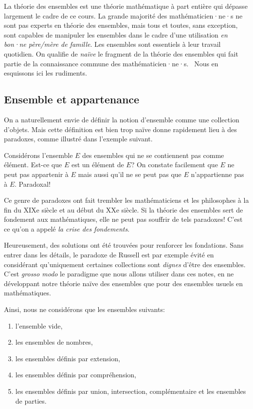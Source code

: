 \documentclass[french,course,oneside,theoremnosection]{lecture}
\begin{document}
La théorie des ensembles est une théorie mathématique à part entière qui dépasse largement le cadre de ce cours. La grande majorité des mathématicien·ne·s ne sont pas experts en théorie des ensembles, mais tous et toutes, sans exception, sont capables de manipuler les ensembles dans le cadre d'une utilisation \emph{en bon·ne père/mère de famille}. Les ensembles sont essentiels à leur travail quotidien. On qualifie de \emph{naïve} le fragment de la théorie des ensembles qui fait partie de la connaissance commune des mathématicien·ne·s.~ Nous en esquissons ici les rudiments.

\subsection{Ensemble et appartenance}
On a naturellement envie de définir la notion d'ensemble comme une collection d'objets. Mais cette définition est bien trop naïve donne rapidement lieu à des paradoxes, comme illustré dans l'exemple suivant.
\begin{example}
Considérons l'ensemble $E$ des ensembles qui ne se contiennent pas comme élément. Est-ce que $E$ est un élément de $E$? On constate facilement que $E$ ne peut pas appartenir à $E$ mais aussi qu'il ne se peut pas que $E$ n'appartienne pas à $E$. Paradoxal!
\end{example}

Ce genre de paradoxes ont fait trembler les mathématiciens et les philosophes à la fin du XIXe siècle et au début du XXe siècle. Si la théorie des ensembles sert de fondement aux mathématiques, elle ne peut pas souffrir de tels paradoxes! C'est ce qu'on a appelé \emph{la crise des fondements}.

Heureusement, des solutions ont été trouvées pour renforcer les fondations. Sans entrer dans les détails, le paradoxe de Russell est par exemple évité en considérant qu'uniquement certaines collections sont \emph{dignes} d'être des ensembles. C'est  \emph{grosso modo} le paradigme que nous allons utiliser dans ces notes, en ne développant notre théorie naïve des ensembles que pour des ensembles usuels en mathématiques.

Ainsi, nous ne considérons que les ensembles suivants:
\begin{enumerate}[(1)]
\item l'ensemble vide,
\item les ensembles de nombres,
\item les ensembles définis par extension,
\item les ensembles définis par compréhension,
\item les ensembles définis par union, intersection, complémentaire et les ensembles de parties.
\end{enumerate}
\end{document}
